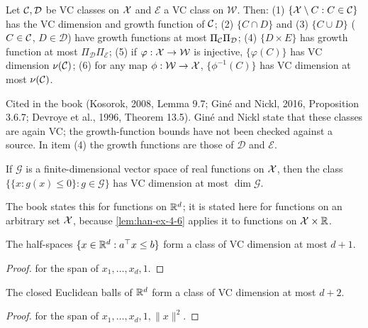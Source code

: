 \begin{theorem}
  \label{thm:han-4-10}
  Let $\mathcal{C},\mathcal D$ be VC classes on $\mathcal{X}$ and $\mathcal E$ a VC class on $\mathcal W$. Then: (1) $\{\mathcal{X}\setminus C:C\in\mathcal{C}\}$ has the VC dimension and growth function of $\mathcal{C}$; (2) $\{C\cap D\}$ and (3) $\{C\cup D\}$ ($C\in\mathcal{C}$, $D\in\mathcal D$) have growth functions at most $\Pi_{\mathcal{C}}\Pi_{\mathcal D}$; (4) $\{D\times E\}$ has growth function at most $\Pi_{\mathcal D}\Pi_{\mathcal E}$; (5) if $\varphi:\mathcal{X}\to\mathcal W$ is injective, $\{\varphi(C)\}$ has VC dimension $\nu(\mathcal{C})$; (6) for any map $\phi:\mathcal W\to\mathcal{X}$, $\{\phi^{-1}(C)\}$ has VC dimension at most $\nu(\mathcal{C})$.
\end{theorem}
\begin{remark}
  Cited in the book (Kosorok, 2008, Lemma 9.7; Gin\'e and Nickl, 2016, Proposition 3.6.7; Devroye et al., 1996, Theorem 13.5). Gin\'e and Nickl state that these classes are again VC; the growth-function bounds have not been checked against a source. In item (4) the growth functions are those of $\mathcal D$ and $\mathcal E$.
\end{remark}

\begin{proposition}
  \label{prop:han-4-1}
  If $\mathcal G$ is a finite-dimensional vector space of real functions on $\mathcal{X}$, then the class $\{\{x:g(x)\le0\}:g\in\mathcal G\}$ has VC dimension at most $\dim\mathcal G$.
\end{proposition}
\begin{remark}
  The book states this for functions on $\mathbb{R}^d$; it is stated here for functions on an arbitrary set $\mathcal{X}$, because \cref{lem:han-ex-4-6} applies it to functions on $\mathcal{X}\times\mathbb{R}$.
\end{remark}

\begin{lemma}
  \label{lem:han-ex-4-4}
  The half-spaces $\{x\in\mathbb{R}^d:a^\top x\le b\}$ form a class of VC dimension at most $d+1$.
\end{lemma}
\begin{proof}
   for the span of $x_1,\dots,x_d,1$.
\end{proof}

\begin{lemma}
  \label{lem:han-ex-4-5}
  The closed Euclidean balls of $\mathbb{R}^d$ form a class of VC dimension at most $d+2$.
\end{lemma}
\begin{proof}
   for the span of $x_1,\dots,x_d,1,\|x\|^2$.
\end{proof}

